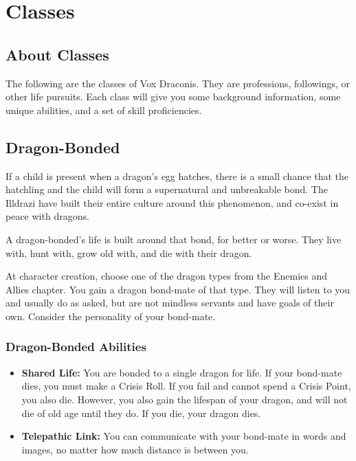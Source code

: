 \chapter{Classes}

\begin{multicols}{2}

\section{About Classes}

The following are the classes of Vox Draconis. They are professions,
followings, or other life pursuits. Each class will give you some
background information, some unique abilities, and a set of skill
proficiencies.

\section{Dragon-Bonded}

If a child is present when a dragon's egg hatches, there is a small
chance that the hatchling and the child will form a supernatural and
unbreakable bond. The Illdrazi have built their entire culture around
this phenomenon, and co-exist in peace with dragons.

A dragon-bonded's life is built around that bond, for better or worse.
They live with, hunt with, grow old with, and die with their dragon.

At character creation, choose one of the dragon types from the
Enemies and Allies chapter. You gain a dragon bond-mate of that
type. They will listen to you and usually do as asked, but are
not mindless servants and have goals of their own. Consider the
personality of your bond-mate.

\subsection{Dragon-Bonded Abilities}

\begin{itemize}
  \item \textbf{Shared Life:} You are bonded to a single dragon for
    life. If your bond-mate dies, you must make a Crisis Roll. If you
    fail and cannot spend a Crisis Point, you also die. However, you
    also gain the lifespan of your dragon, and will not die of old age until
    they do. If you die, your dragon dies.
  \item \textbf{Telepathic Link:} You can communicate with your bond-mate in
    words and images, no matter how much distance is between you.
\end{itemize}


\end{multicols}
